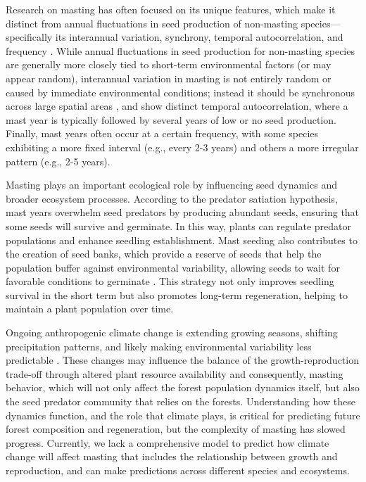 \documentclass[11pt,letter]{article}
\begin{document}
Research on masting has often focused on its unique features, which make it distinct from annual fluctuations in seed production of non-masting species---specifically its interannual variation, synchrony, temporal autocorrelation, and frequency \citep{hacket2021climate}. While annual fluctuations in seed production for non-masting species are generally more closely tied to short-term environmental factors (or may appear random), interannual variation in masting is not entirely random or caused by immediate environmental conditions; instead it should be synchronous across large spatial areas \citep[e.g., hundreds of kilometers,][]{kelly1994evolutionary}, and show distinct temporal autocorrelation, where a mast year is typically followed by several years of low or no seed production. Finally, mast years often occur at a certain frequency, with some species exhibiting a more fixed interval (e.g., every 2-3 years) and others a more irregular pattern (e.g., 2-5 years).

Masting plays an important ecological role by influencing seed dynamics and broader ecosystem processes. According to the predator satiation hypothesis, mast years overwhelm seed predators by producing abundant seeds, ensuring that some seeds will survive and germinate. In this way, plants can regulate predator populations and enhance seedling establishment. Mast seeding also contributes to the creation of seed banks, which provide a reserve of seeds that help the population buffer against environmental variability, allowing seeds to wait for favorable conditions to germinate \citep{venable1989modeling}. This strategy not only improves seedling survival in the short term but also promotes long-term regeneration, helping to maintain a plant population over time.

Ongoing anthropogenic climate change is extending growing seasons, shifting precipitation patterns, and likely making environmental variability less predictable  \citep{calvin2023ipcc}. These changes may influence the balance of the growth-reproduction trade-off through altered plant resource availability and consequently, masting behavior, which will not only affect the forest population dynamics itself, but also the seed predator community that relies on the forests. Understanding how these dynamics function, and the role that climate plays, is critical for predicting future forest composition and regeneration, but the complexity of masting has slowed progress. Currently, we lack a comprehensive model to predict how climate change will affect masting that includes the relationship between growth and reproduction, and can make predictions across different species and ecosystems.
\end{document}
